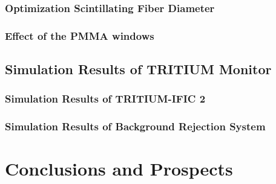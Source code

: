 \documentclass[12pt,a4paper]{book}
\begin{document}
			\subsection[Optimization Scintillating Fiber Diameter]{Optimization Scintillating Fiber Diameter}\label{subsec:ResultsFiberDiameter}
			
		
			\subsection[Effect of the PMMA windows]{Effect of the PMMA windows}\label{subsec:ResultsPMMAWindows}
			
		
		\section[Simulation Results of TRITIUM Monitor]{Simulation Results of TRITIUM Monitor}\label{sec:ResultsSimulatedTRITIUMmonitor}
		
		
		\subsection[Simulation Results of TRITIUM-IFIC 2]{Simulation Results of TRITIUM-IFIC 2}\label{subsec:ResultsSimulatedTRITIUMIFIC2}
		
		
		\subsection[Simulation Results of Background Rejection System]{Simulation Results of Background Rejection System}\label{subsec:ResultsSimulatedBackgroundRejectionSystem}
		
		\newpage

\chapter{Conclusions and Prospects}  \label{chap:Conclusions}



\appendix
\appendixpage
\noappendicestocpagenum
\addappheadtotoc
\end{document}
